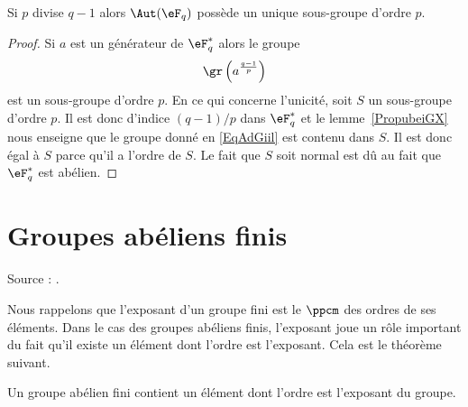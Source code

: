 \begin{corollary}       \label{CorwgmoTK}
    Si \( p\) divise \( q-1\) alors \( \Aut(\eF_q)\) possède un unique sous-groupe d'ordre \( p\).
\end{corollary}

\begin{proof}
    Si \( a\) est un générateur de \( \eF_q^*\) alors le groupe
    \begin{equation}    \label{EqAdGiil}
        \gr\left( a^{\frac{ q-1 }{ p }} \right)
    \end{equation}
    est un sous-groupe d'ordre \( p\). En ce qui concerne l'unicité, soit \( S\) un sous-groupe d'ordre \( p\). Il est donc d'indice \( (q-1)/p\) dans \( \eF_q^*\) et le lemme~\ref{PropubeiGX} nous enseigne que le groupe donné en \eqref{EqAdGiil} est contenu dans \( S\). Il est donc égal à \( S\) parce qu'il a l'ordre de \( S\). Le fait que \( S\) soit normal est dû au fait que \( \eF_q^*\) est abélien.
\end{proof}




\section{Groupes abéliens finis}

Source : \cite{FabricegPSFinis}.

Nous rappelons que l'exposant d'un groupe fini est le \( \ppcm\) des ordres de ses éléments. Dans le cas des groupes abéliens finis, l'exposant joue un rôle important du fait qu'il existe un élément dont l'ordre est l'exposant. Cela est le théorème suivant.

\begin{theorem}
    Un groupe abélien fini contient un élément dont l'ordre est l'exposant du groupe.
\end{theorem}

